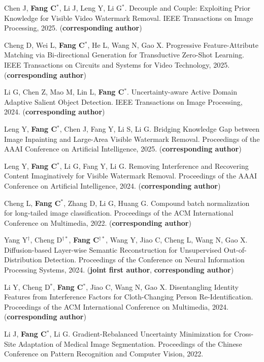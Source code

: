 \documentclass[a4paper,36pt]{article}
\newcommand{\tb}[1]{\textbf{#1}}
\newcommand{\resumeItemWithoutTitle}[1]{
  \item\justifying\small{
    {#1 \vspace{-2pt}}
  }
}
\begin{document}
\resumeItemWithoutTitle{Chen J, \tb{Fang C}$^\ast$, Li J, Leng Y, Li G$^\ast$. Decouple and Couple: Exploiting Prior Knowledge for Visible Video Watermark Removal. IEEE Transactions on Image Processing, 2025. (\tb{corresponding author})}

\resumeItemWithoutTitle{Cheng D, Wei L, \tb{Fang C}$^\ast$, He L, Wang N, Gao X. Progressive Feature-Attribute Matching via Bi-directional Generation for Transductive Zero-Shot Learning. IEEE Transactions on Circuits and Systems for Video Technology, 2025. (\tb{corresponding author})}

\resumeItemWithoutTitle{Li G, Chen Z, Mao M, Lin L, \tb{Fang C}$^\ast$. Uncertainty-aware Active Domain Adaptive Salient Object Detection. IEEE Transactions on Image Processing, 2024. (\tb{corresponding author})}

\resumeItemWithoutTitle{Leng Y, \tb{Fang C}$^{\ast}$, Chen J, Fang Y, Li S, Li G. Bridging Knowledge Gap between Image Inpainting and Large-Area Visible Watermark Removal. Proceedings of the AAAI Conference on Artificial Intelligence, 2025. (\tb{corresponding author})}

\resumeItemWithoutTitle{Leng Y, \tb{Fang C}$^{\ast}$, Li G, Fang Y, Li G. Removing Interference and Recovering Content Imaginatively for Visible Watermark Removal. Proceedings of the AAAI Conference on Artificial Intelligence, 2024. (\tb{corresponding author})}

\resumeItemWithoutTitle{Cheng L, \tb{Fang C}$^{\ast}$, Zhang D, Li G, Huang G. Compound batch normalization for long-tailed image classification. Proceedings of the ACM International Conference on Multimedia, 2022. (\tb{corresponding author})}

\resumeItemWithoutTitle{Yang Y$^{\dag}$, Cheng D$^{\dag\ast}$, \tb{Fang C}$^{\dag\ast}$, Wang Y, Jiao C, Cheng L, Wang N, Gao X. Diffusion-based Layer-wise Semantic Reconstruction for Unsupervised Out-of-Distribution Detection. Proceedings of the Conference on Neural Information Processing Systems, 2024. (\tb{joint first author}, \tb{corresponding author})}

\resumeItemWithoutTitle{Li Y, Cheng D$^{\ast}$, \tb{Fang C}$^{\ast}$, Jiao C, Wang N, Gao X. Disentangling Identity Features from Interference Factors for Cloth-Changing Person Re-Identification. Proceedings of the ACM International Conference on Multimedia, 2024. (\tb{corresponding author})}

\resumeItemWithoutTitle{Li J, \tb{Fang C}$^{\ast}$, Li G. Gradient-Rebalanced Uncertainty Minimization for Cross-Site Adaptation of Medical Image Segmentation. Proceedings of the Chinese Conference on Pattern Recognition and Computer Vision, 2022.}
\end{document}
